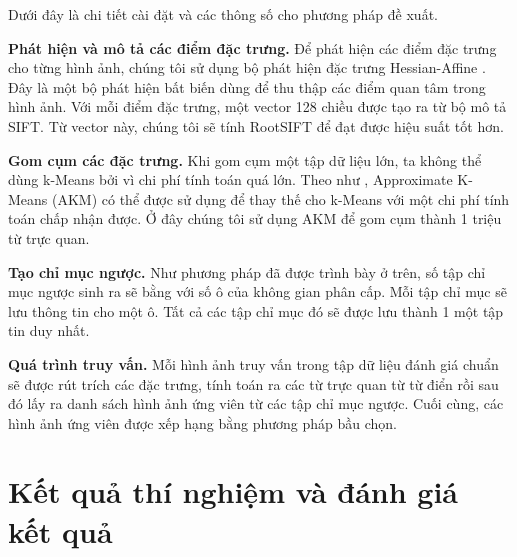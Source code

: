Dưới đây là chi tiết cài đặt và các thông số cho phương pháp đề xuất.

\textbf{Phát hiện và mô tả các điểm đặc trưng.} Để phát hiện các điểm đặc trưng cho từng hình ảnh, chúng tôi sử dụng bộ phát hiện đặc trưng Hessian-Affine \cite{mikolajczyk2005comparison}. Đây là một bộ phát hiện bất biến dùng để thu thập các điểm quan tâm trong hình ảnh. Với mỗi điểm đặc trưng, một vector 128 chiều được tạo ra từ bộ mô tả SIFT. Từ vector này, chúng tôi sẽ tính RootSIFT \cite{arandjelovic2012three} để đạt được hiệu suất tốt hơn.

\textbf{Gom cụm các đặc trưng.} Khi gom cụm một tập dữ liệu lớn, ta không thể dùng k-Means bởi vì chi phí tính toán quá lớn. Theo như \cite{philbin2007object}, Approximate K-Means (AKM) có thể được sử dụng để thay thế cho k-Means với một chi phí tính toán chấp nhận được. Ở đây chúng tôi sử dụng AKM để gom cụm thành 1 triệu từ trực quan.

\textbf{Tạo chỉ mục ngược.} Như phương pháp đã được trình bày ở trên, số tập chỉ mục ngược sinh ra sẽ bằng với số ô của không gian phân cấp. Mỗi tập chỉ mục sẽ lưu thông tin cho một ô. Tất cả các tập chỉ mục đó sẽ được lưu thành 1 một tập tin duy nhất.

\textbf{Quá trình truy vấn.} Mỗi hình ảnh truy vấn trong tập dữ liệu đánh giá chuẩn sẽ được rút trích các đặc trưng, tính toán ra các từ trực quan từ từ điển rồi sau đó lấy ra danh sách hình ảnh ứng viên từ các tập chỉ mục ngược. Cuối cùng, các hình ảnh ứng viên được xếp hạng bằng phương pháp bầu chọn.

\section{Kết quả thí nghiệm và đánh giá kết quả}
\label{experimental-result}

